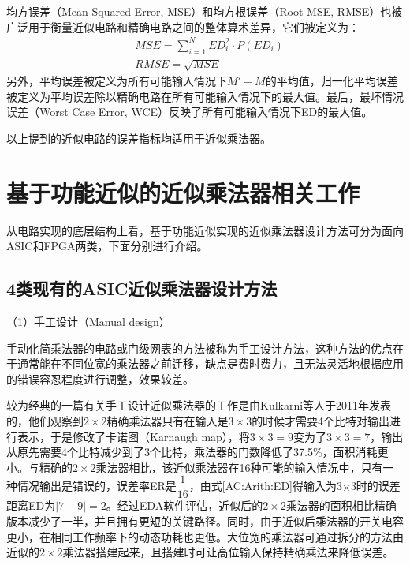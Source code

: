 均方误差（Mean Squared Error, MSE）和均方根误差（Root MSE, RMSE）也被广泛用于衡量近似电路和精确电路之间的整体算术差异，它们被定义为：
\begin{align}
    & MSE = \sum _{i=1}^{N}ED_{i}^{2}\cdot P(ED_{i}) \label{AC:Arith:MSE} \\
    & RMSE = \sqrt {MSE} \label{AC:Arith:RMSE}
\end{align}
另外，平均误差被定义为所有可能输入情况下$M \prime - M$的平均值，归一化平均误差被定义为平均误差除以精确电路在所有可能输入情况下的最大值。最后，最坏情况误差（Worst Case Error, WCE）反映了所有可能输入情况下ED的最大值。

以上提到的近似电路的误差指标均适用于近似乘法器。

\section{基于功能近似的近似乘法器相关工作}

从电路实现的底层结构上看，基于功能近似\cite{AC:ALS:survey}实现的近似乘法器设计方法可分为面向ASIC和FPGA两类，下面分别进行介绍。

\subsection{4类现有的ASIC近似乘法器设计方法}

（1）手工设计（Manual design）

手动化简乘法器的电路或门级网表的方法被称为手工设计方法，这种方法的优点在于通常能在不同位宽的乘法器之前迁移，缺点是费时费力，且无法灵活地根据应用的错误容忍程度进行调整，效果较差。

较为经典的一篇有关手工设计近似乘法器的工作是由Kulkarni等人\cite{AC:AM:KMap}于2011年发表的，他们观察到$2 \times 2$精确乘法器只有在输入是$3 \times 3$的时候才需要4个比特对输出进行表示，于是修改了卡诺图（Karnaugh map），将$3 \times 3 = 9$变为了$3 \times 3 = 7$，输出从原先需要4个比特减少到了3个比特，乘法器的门数降低了37.5\%，面积消耗更小。与精确的$2 \times 2$乘法器相比，该近似乘法器在16种可能的输入情况中，只有一种情况输出是错误的，误差率ER是$\dfrac{1}{16}$，由式\eqref{AC:Arith:ED}得输入为3$\times$3时的误差距离ED为$|7 − 9| = 2$。经过EDA软件评估，近似后的$2 \times 2$乘法器的面积相比精确版本减少了一半，并且拥有更短的关键路径。同时，由于近似后乘法器的开关电容更小，在相同工作频率下的动态功耗也更低。大位宽的乘法器可通过拆分的方法由近似的$2 \times 2$乘法器搭建起来，且搭建时可让高位输入保持精确乘法来降低误差。

